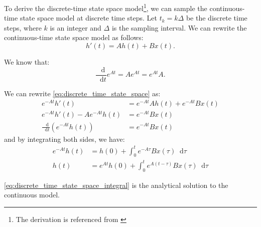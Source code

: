 \documentclass[a4paper]{article}
\newcommand*{\dif}{\mathop{}\!\mathrm{d}}
\begin{document}
To derive the discrete-time state space model\footnote{The derivation is referenced from \cite{wikipedia_discretization}}, we can sample the continuous-time state space model at discrete time steps. Let $t_k = k\Delta$ be the discrete time steps, where $k$ is an integer and $\Delta$ is the sampling interval. We can rewrite the continuous-time state space model as follows:
\begin{equation}
    \label{eq:discrete_time_state_space}
    h'(t) = Ah(t) + Bx(t).
\end{equation}

We know that:
\begin{equation}
    \frac{\dif}{\dif t} e^{At} = A e^{At} = e^{At} A.
\end{equation}

We can rewrite \autoref{eq:discrete_time_state_space} as:
\begin{align}
    e^{-At} h'(t) &= e^{-At} Ah(t) + e^{-At} Bx(t) \\
    e^{-At} h'(t) - A e^{-At} h(t) &= e^{-At} Bx(t) \\
    \frac{\dif}{\dif t} (e^{-At} h(t)) &= e^{-At} Bx(t)
\end{align}
and by integrating both sides, we have:
\begin{align}
    e^{-At} h(t) &= h(0) + \int_0^t e^{-A\tau} B x(\tau) \dif \tau \\
    h(t) &= e^{At} h(0) + \int_0^t e^{A(t-\tau)} B x(\tau) \dif \tau \label{eq:discrete_time_state_space_integral}
\end{align}

\autoref{eq:discrete_time_state_space_integral} is the analytical solution to the continuous model. 
\end{document}

